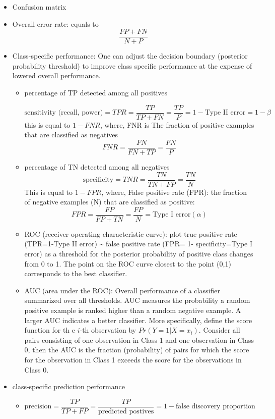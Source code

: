\documentclass[
  letterpaper,
  DIV=11,
  numbers=noendperiod]{scrreprt}
\providecommand{\tightlist}{%
  \setlength{\itemsep}{0pt}\setlength{\parskip}{0pt}}\usepackage{longtable,booktabs,array}
\begin{document}
\begin{itemize}
\item
  Confusion matrix
\item
  Overall error rate: equals to \[
  \frac{FP+FN}{N+P}
  \]
\item
  Class-specific performance: One can adjust the decision boundary
  (posterior probability threshold) to improve class specific
  performance at the expense of lowered overall performance.

  \begin{itemize}
  \item
    percentage of TP detected among all positives

    \[\text{sensitivity (recall, power)} = TPR = \frac{TP}{TP+FN}=\frac{TP}{P}= 1-\text{Type II error}=1-\beta\]
    this is equal to \(1- FNR\), where, FNR is The fraction of positive
    examples that are classified as negatives \[
    FNR = \frac{FN}{FN+TP}=\frac{FN}{P} 
    \]
  \item
    percentage of TN detected among all negatives
    \[\text{specificity}= TNR = \frac{TN}{TN+FP}=\frac{TN}{N}\] This is
    equal to \(1-FPR\), where, False positive rate (FPR): the fraction
    of negative examples (N) that are classified as positive: \[
    FPR=\frac{FP}{FP+TN}=\frac{FP}{N} = \text{Type I error} (\alpha) 
    \]
  \item
    ROC (receiver operating characteristic curve): plot true positive
    rate (TPR=1-Type II error) \textasciitilde{} false positive rate
    (FPR= 1- specificity=Type I error) as a threshold for the posterior
    probability of positive class changes from 0 to 1. The point on the
    ROC curve closest to the point (0,1) corresponds to the best
    classifier.
  \item
    AUC (area under the ROC): Overall performance of a classifier
    summarized over all thresholds. AUC measures the probability a
    random positive example is ranked higher than a random negative
    example. A larger AUC indicates a better classifier. More
    specifically, define the score function for th e \(i\)-th
    observation by \(Pr(Y=1|X=x_i)\). Consider all pairs consisting of
    one observation in Class 1 and one observation in Class 0, then the
    AUC is the fraction (probability) of pairs for which the score for
    the observation in Class 1 exceeds the score for the observations in
    Class 0.
  \end{itemize}
\item
  class-specific prediction performance

  \begin{itemize}
  \tightlist
  \item
    \[\text{precision} = \frac{TP}{TP+FP}=\frac{TP}{\text{predicted postives}}=1-\text{false discovery proportion}\]
  \end{itemize}
\end{itemize}
\end{document}
